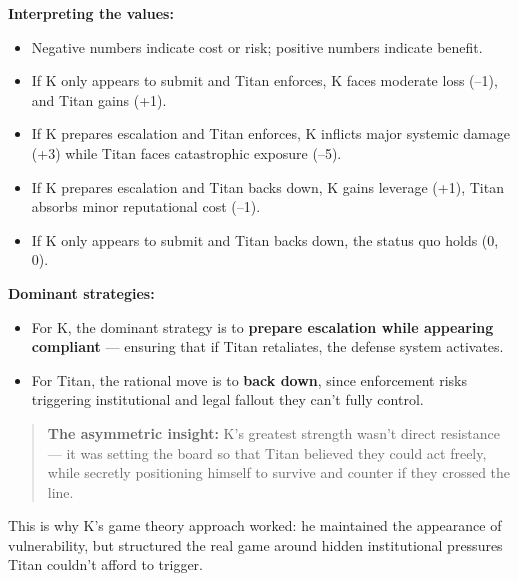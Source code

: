 \textbf{Interpreting the values:}

\begin{itemize}
    \item Negative numbers indicate cost or risk; positive numbers indicate benefit.
    \item If K only appears to submit and Titan enforces, K faces moderate loss (–1), and Titan gains (+1).
    \item If K prepares escalation and Titan enforces, K inflicts major systemic damage (+3) while Titan faces catastrophic exposure (–5).
    \item If K prepares escalation and Titan backs down, K gains leverage (+1), Titan absorbs minor reputational cost (–1).
    \item If K only appears to submit and Titan backs down, the status quo holds (0, 0).
\end{itemize}

\medskip

\textbf{Dominant strategies:}

\begin{itemize}
    \item For K, the dominant strategy is to \textbf{prepare escalation while appearing compliant} —  
    ensuring that if Titan retaliates, the defense system activates.
    
    \item For Titan, the rational move is to \textbf{back down},  
    since enforcement risks triggering institutional and legal fallout they can’t fully control.
\end{itemize}

\begin{quote}
    \textbf{The asymmetric insight:} K’s greatest strength wasn’t direct resistance —  
    it was setting the board so that Titan believed they could act freely,  
    while secretly positioning himself to survive and counter if they crossed the line.
\end{quote}

This is why K’s game theory approach worked:  
he maintained the appearance of vulnerability,  
but structured the real game around hidden institutional pressures Titan couldn’t afford to trigger.
